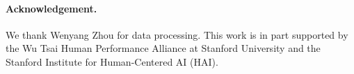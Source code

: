 \paragraph{Acknowledgement.}
We thank Wenyang Zhou for data processing. This work is in part supported by the Wu Tsai Human Performance Alliance at Stanford University and the Stanford Institute for
Human-Centered AI (HAI). 